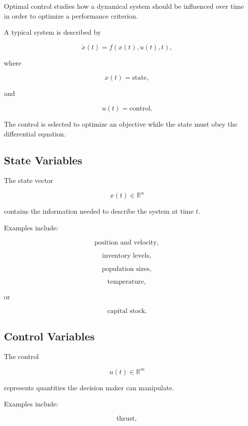 Optimal control studies how a dynamical system should be influenced over
time in order to optimize a performance criterion.

A typical system is described by

\[
\boxed{
\dot{x}(t)
=
f
(
x(t),
u(t),
t
),
}
\]

where

\[
x(t)
=
\text{state},
\]

and

\[
u(t)
=
\text{control}.
\]

The control is selected to optimize an objective while the state must obey
the differential equation.

\subsection{State Variables}
\label{subsec:optimal-control-state}

The state vector

\[
\boxed{
x(t)
\in
\mathbb{R}^n
}
\]

contains the information needed to describe the system at time \(t\).

Examples include:

\[
\boxed{
\text{position and velocity},
}
\]

\[
\boxed{
\text{inventory levels},
}
\]

\[
\boxed{
\text{population sizes},
}
\]

\[
\boxed{
\text{temperature},
}
\]

or

\[
\boxed{
\text{capital stock}.
}
\]

\subsection{Control Variables}
\label{subsec:optimal-control-control}

The control

\[
\boxed{
u(t)
\in
\mathbb{R}^m
}
\]

represents quantities the decision maker can manipulate.

Examples include:

\[
\boxed{
\text{thrust},
}
\]

